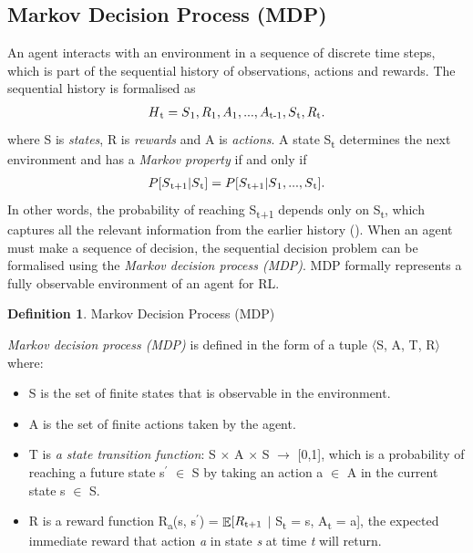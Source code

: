 \documentclass[11pt,twoside]{report}
\theoremstyle{plain}
\theoremstyle{definition}
\newtheorem{defn}[thm]{Definition} %
\DeclareMathOperator{\E}{\mathbb{E}}
\begin{document}
\subsection{Markov Decision Process (MDP)}
\label{mdp_subsection}
An agent interacts with an environment in a sequence of discrete time steps, which is part of the sequential history of observations, actions and rewards. The sequential history is formalised as 
\begin{equation}
\begin{split}
H\textsubscript{t} = S\textsubscript{1}, R\textsubscript{1}, A\textsubscript{1}, ..., A\textsubscript{t-1}, S\textsubscript{t}, R\textsubscript{t}.  
\end{split}
\end{equation}
where S is \textit{states}, R is \textit{rewards} and A is \textit{actions}. A state S\textsubscript{t} determines the next environment and has a \textit{Markov property} if and only if 
\begin{equation}
\begin{split}
P[S\textsubscript{t+1} \vert S\textsubscript{t}] = P[S\textsubscript{t+1} \vert S\textsubscript{1}, ..., S\textsubscript{t}].
\end{split}
\end{equation}
In other words, the probability of reaching S\textsubscript{t+1} depends only on S\textsubscript{t}, which captures all the relevant information from the earlier history (\cite{Puterman1994}).
When an agent must make a sequence of decision, the sequential decision problem can be formalised using the \textit{Markov decision process (MDP)}. MDP formally represents a fully observable environment of an agent for 
RL.
\begin{defn}{Markov Decision Process (MDP)}

\textit{Markov decision process (MDP)} is defined in the form of a tuple $\langle$S, A, T, R$\rangle$ where:
\begin{itemize}
\item S is the set of finite states that is observable in the environment.
\item A is the set of finite actions taken by the agent.
\item T is \textit{a state transition function}: S $\times$ A $\times$ S $\rightarrow$ [0,1], which is a probability of reaching a future state s$^\prime$ $\in$ S by taking an action a $\in$ A in the current state  s $\in$ S.
\item R is a reward function R\textsubscript{a}(s, s$^\prime$) = $\displaystyle \E[R\textsubscript{t+1} $ $\vert$ S\textsubscript{t} = s, A\textsubscript{t} = a], the expected immediate reward that action \textit{a} in state \textit{s} at time \textit{t} will return.
\end{itemize}
\end{defn}
\end{document}
